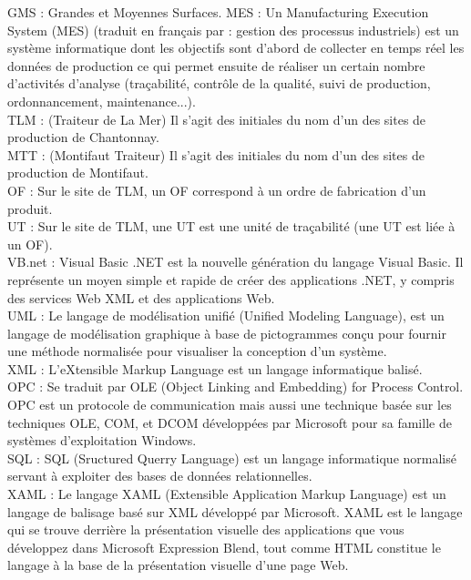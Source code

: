 \documentclass[a4paper,12pt]{extarticle}
\begin{document}
GMS : Grandes et Moyennes Surfaces.
MES : Un Manufacturing Execution System (MES) (traduit en français par : gestion des processus industriels) est un système informatique dont les objectifs sont d'abord de collecter en temps réel les données de production ce qui permet ensuite de réaliser un certain nombre d'activités d'analyse (traçabilité, contrôle de la qualité, suivi de production, ordonnancement, maintenance...).\\
TLM : (Traiteur de La Mer) Il s'agit des initiales du nom d'un des sites de production de Chantonnay.\\
MTT : (Montifaut Traiteur) Il s'agit des initiales du nom d'un des sites de production de Montifaut.\\
OF : Sur le site de TLM, un OF correspond à un ordre de fabrication d'un produit.\\
UT : Sur le site de TLM, une UT est une unité de traçabilité (une UT est liée à un OF).\\
VB.net : Visual Basic .NET est la nouvelle génération du langage Visual Basic. Il représente un moyen simple et rapide de créer des applications .NET, y compris des services Web XML et des applications Web.\\
UML : Le langage de modélisation unifié (Unified Modeling Language), est un langage de modélisation graphique à base de pictogrammes conçu pour fournir une méthode normalisée pour visualiser la conception d'un système.\\
XML : L'eXtensible Markup Language est un langage informatique balisé.\\
OPC : Se traduit par OLE (Object Linking and Embedding) for Process Control. OPC est un protocole de communication mais aussi une technique basée sur les techniques OLE, COM, et DCOM développées par Microsoft pour sa famille de systèmes d'exploitation Windows.\\
SQL : SQL (Sructured Querry Language) est un langage informatique normalisé servant à exploiter des bases de données relationnelles.\\
XAML : Le langage XAML (Extensible Application Markup Language) est un langage de balisage basé sur XML développé par Microsoft. XAML est le langage qui se trouve derrière la présentation visuelle des applications que vous développez dans Microsoft Expression Blend, tout comme HTML constitue le langage à la base de la présentation visuelle d’une page Web.\\
	
	\clearpage
	
\end{document}
